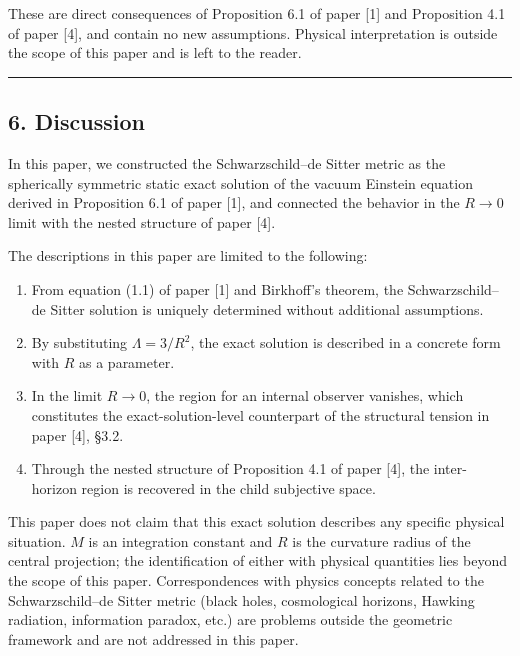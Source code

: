 \documentclass[a4paper,11pt]{article}
\theoremstyle{definition}
\providecommand{\tightlist}{\setlength{\itemsep}{0pt}\setlength{\parskip}{0pt}}
\begin{document}
These are direct consequences of Proposition 6.1 of paper {[}1{]} and
Proposition 4.1 of paper {[}4{]}, and contain no new assumptions.
Physical interpretation is outside the scope of this paper and is left
to the reader.

\begin{center}\rule{0.5\linewidth}{0.5pt}\end{center}

\subsection{6. Discussion}\label{discussion}

In this paper, we constructed the Schwarzschild--de Sitter metric as the
spherically symmetric static exact solution of the vacuum Einstein
equation derived in Proposition 6.1 of paper {[}1{]}, and connected the
behavior in the \(R \to 0\) limit with the nested structure of paper
{[}4{]}.

The descriptions in this paper are limited to the following:

\begin{enumerate}
\def\labelenumi{\arabic{enumi}.}
\tightlist
\item
  From equation (1.1) of paper {[}1{]} and Birkhoff's theorem, the
  Schwarzschild--de Sitter solution is uniquely determined without
  additional assumptions.
\item
  By substituting \(\Lambda = 3/R^2\), the exact solution is described
  in a concrete form with \(R\) as a parameter.
\item
  In the limit \(R \to 0\), the region for an internal observer
  vanishes, which constitutes the exact-solution-level counterpart of
  the structural tension in paper {[}4{]}, §3.2.
\item
  Through the nested structure of Proposition 4.1 of paper {[}4{]}, the
  inter-horizon region is recovered in the child subjective space.
\end{enumerate}

This paper does not claim that this exact solution describes any
specific physical situation. \(M\) is an integration constant and \(R\)
is the curvature radius of the central projection; the identification of
either with physical quantities lies beyond the scope of this paper.
Correspondences with physics concepts related to the Schwarzschild--de
Sitter metric (black holes, cosmological horizons, Hawking radiation,
information paradox, etc.) are problems outside the geometric framework
and are not addressed in this paper.
\end{document}
